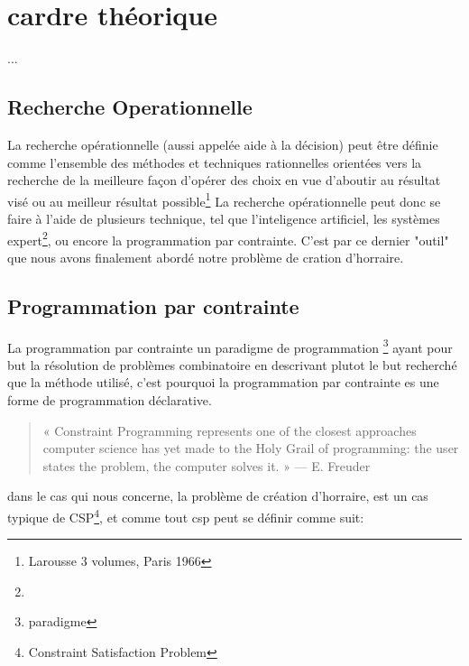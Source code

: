 \section{cardre théorique}
...
\subsection{Recherche Operationnelle}
La recherche opérationnelle (aussi appelée aide à la décision) peut être définie comme l'ensemble des méthodes et techniques rationnelles orientées vers la recherche de la meilleure façon d'opérer des choix en vue d'aboutir au résultat visé ou au meilleur résultat possible\footnote{Larousse 3 volumes, Paris 1966}
La recherche opérationnelle peut donc se faire à l'aide de plusieurs technique, tel que l'inteligence artificiel, les systèmes expert\footnote{}, ou encore la programmation par contrainte.  C'est par ce dernier "outil" que nous avons finalement abordé notre problème de cration d'horraire.
\subsection{Programmation par contrainte}

La programmation par contrainte un paradigme de programmation \footnote{paradigme} ayant pour but la résolution de problèmes combinatoire en
descrivant plutot le but recherché que la méthode utilisé, c'est pourquoi la programmation par contrainte es une forme de programmation déclarative.
\begin{quote}
« Constraint Programming represents one of the closest approaches computer science has yet made to the Holy Grail of programming: the user states the problem, the computer solves it. »
— E. Freuder
\end{quote}

dans le cas qui nous concerne, la problème de création d'horraire, est un cas typique de CSP\footnote{Constraint Satisfaction Problem}, et comme tout csp peut se définir comme suit:
   



